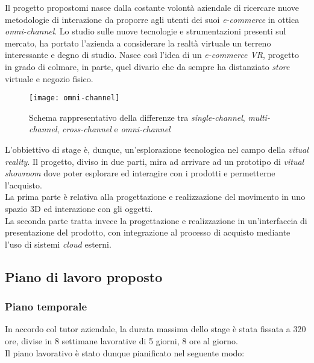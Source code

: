 Il progetto propostomi nasce dalla costante volontà aziendale di ricercare nuove metodologie di interazione da proporre agli utenti dei suoi \textit{e-commerce} in ottica \textit{omni-channel}. Lo studio sulle nuove tecnologie e strumentazioni presenti sul mercato, ha portato l'azienda a considerare la realtà virtuale un terreno interessante e degno di studio. Nasce così l'idea di un \textit{e-commerce VR}, progetto in grado di colmare, in parte, quel divario che da sempre ha distanziato \textit{store} virtuale e negozio fisico.

\label{Omni-channel}
\begin{figure}[ht]
	\begin{center}
		\texttt{[image: omni-channel]}
		\caption{Schema rappresentativo della differenze tra \textit{single-channel}, \textit{multi-channel}, \textit{cross-channel} e \textit{omni-channel}}
	\end{center}
\end{figure}
\FloatBarrier

L'obbiettivo di stage è, dunque, un'esplorazione tecnologica nel campo della \textit{vitual reality}. Il progetto, diviso in due parti, mira ad arrivare ad un prototipo di \textit{vitual showroom} dove poter esplorare ed interagire con i prodotti e permetterne l'acquisto. \\
La prima parte è relativa alla progettazione e realizzazione del movimento in uno spazio 3D ed interazione con gli oggetti. \\
La seconda parte tratta invece la progettazione e realizzazione in un'interfaccia di presentazione del prodotto, con integrazione al processo di acquisto mediante l'uso di sistemi \textit{cloud} esterni.

\subsection{Piano di lavoro proposto}

\subsubsection{Piano temporale}

In accordo col tutor aziendale, la durata massima dello stage è stata fissata a 320 ore, divise in 8 settimane lavorative di 5 giorni, 8 ore al giorno. \\
Il piano lavorativo è stato dunque pianificato nel seguente modo:

